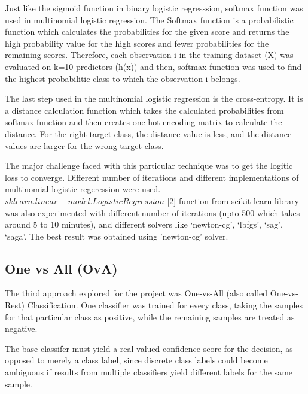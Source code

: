 \documentclass[journal]{IEEEtran}
\begin{document}
Just like the sigmoid function in binary logistic regresssion, softmax function was used in multinomial logistic regression. The Softmax function is a probabilistic function which calculates the probabilities for the given score and returns the high probability value for the high scores and fewer probabilities for the remaining scores. Therefore, each observation i in the training dataset (X) was evaluated on k=10 predictors (h(x)) and then, softmax function was used to find the highest probabilitic class to which the observation i belongs. \par
The last step used in the multinomial logistic regression is the cross-entropy. It is a distance calculation function which takes the calculated probabilities from softmax function and then creates one-hot-encoding matrix to calculate the distance. For the right target class, the distance value is less, and the distance values are larger for the wrong target class. \par

The major challenge faced with this particular technique was to get the logitic loss to converge. Different number of iterations and different implementations of multinomial logistic regeression were used. $sklearn.linear-model.LogisticRegression$ [2] function from scikit-learn library was also experimented with different number of iterations (upto 500 which takes around 5 to 10 minutes), and different solvers like ‘newton-cg’, ‘lbfgs’, ‘sag’, ‘saga’. The best result was obtained using 'newton-cg' solver.

\subsection{One vs All (OvA)}
The third approach explored for the project was One-vs-All (also called One-vs-Rest) Classification. One classifier was trained for every class, taking the samples for that particular class as positive, while the remaining samples are treated as negative. \par
The base classifer must yield a real-valued confidence score for the decision, as opposed to merely a class label, since discrete class labels could become ambiguous if results from multiple classifiers yield different labels for the same sample. \par
\end{document}

